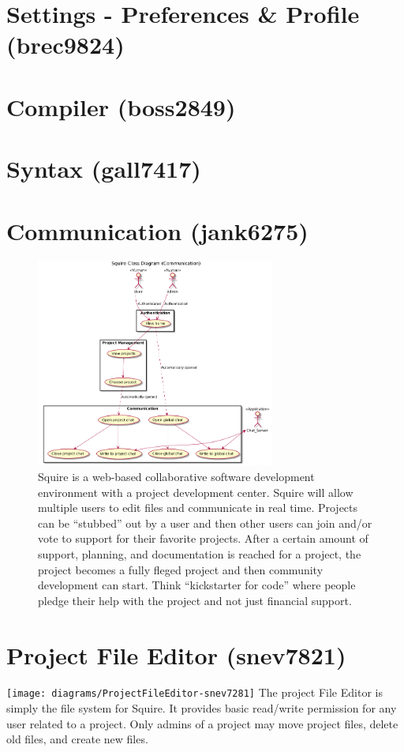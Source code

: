 \documentclass[11pt]{report}
\begin{document}
\section{Settings - Preferences \& Profile (brec9824)}



\section{Compiler (boss2849)}



\section{Syntax (gall7417)}



\section{Communication (jank6275)}
    \begin{figure}
        \begin{center}
            \includegraphics[width=0.7\textwidth]{diagrams/communication-jank6275}
        \end{center}
        \caption{Squire is a web-based collaborative software development environment with a project development center. Squire will allow multiple users to edit files and communicate in real time. Projects can be ``stubbed'' out by a user and then other users can join and/or vote to support for their favorite projects. After a certain amount of support, planning, and documentation is reached for a project, the project becomes a fully fleged project and then community development can start. Think ``kickstarter for code'' where people pledge their help with the project and not just financial support.}
    \end{figure}


\section{Project File Editor (snev7821)}
    \texttt{[image: diagrams/ProjectFileEditor-snev7281]}
    The project File Editor is simply the file system for Squire. It provides basic read/write permission for any user related to a project. Only admins of a project may move project files, delete old files, and create new files.


    
\end{document}
